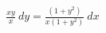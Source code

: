 \documentclass[preview]{standalone}
\begin{document}
\begin{align*}
\frac{x y}{x} \  dy = \frac{\left( 1 + {y}^{2} \right)}{x \left( 1 + {y}^{2} \right)} \  dx
\end{align*}
\end{document}
